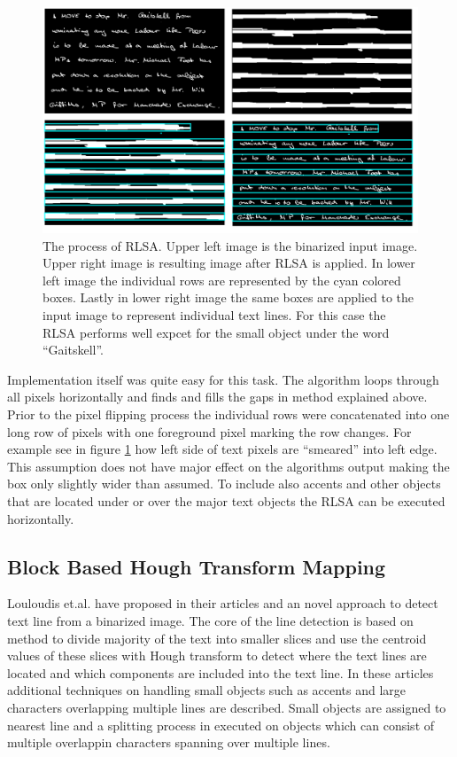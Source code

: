\documentclass{article}
\begin{document}
          \begin{figure}
            \centering
            \includegraphics[natwidth=1516,natheight=912,scale=0.3]{rlsademo.png}
            \caption{The process of RLSA. Upper left image is the binarized input image. Upper right image is resulting image after RLSA is applied. In lower left image the individual rows are represented by the cyan colored boxes. Lastly in lower right image the same boxes are applied to the input image to represent individual text lines. For this case the RLSA performs well expcet for the small object under the word ``Gaitskell''. \label{fig:workingrlsa} }
          \end{figure}

          Implementation itself was quite easy for this task. The algorithm loops through all pixels horizontally and finds and fills the gaps in method explained above. Prior to the pixel flipping process the individual rows were concatenated into one long row of pixels with one foreground pixel marking the row changes. For example see in figure \ref{fig:workingrlsa} how left side of text pixels are ``smeared'' into left edge. This assumption does not have major effect on the algorithms output making the box only slightly wider than assumed. To include also accents and other objects that are located under or over the major text objects the RLSA can be executed horizontally.


        \subsection{Block Based Hough Transform Mapping}
          Louloudis et.al. have proposed in their articles \cite{Louloudis1} and \cite{Louloudis2} an novel approach to detect text line from a binarized image. The core of the line detection is based on method to divide majority of the text into smaller slices and use the centroid values of these slices with Hough transform to detect where the text lines are located and which components are included into the text line. In these articles additional techniques on handling small objects such as accents and large characters overlapping multiple lines are described. Small objects are assigned to nearest line and a splitting process in executed on objects which can consist of multiple overlappin characters spanning over multiple lines.
\end{document}
